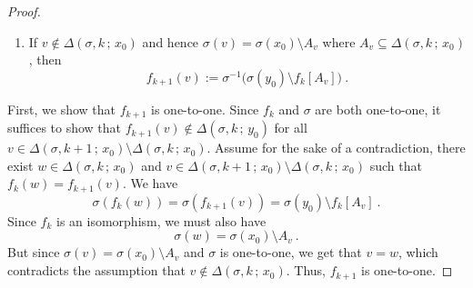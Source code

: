 \documentclass[10pt,a4paper]{amsart}
\begin{document}
\begin{proof}
\begin{enumerate}
\item   If  $  v  \not\in     \Delta \left(  \sigma , k  \,  ;   \,   x_0   \right)     $  
and   hence  $  \sigma ( v )  =   \sigma  ( x_0  )   \setminus  A_v    $
where   $   A_v     \subseteq    \Delta \left(  \sigma , k  \,  ;   \,   x_0   \right)   $, 
then 
\[
 f_{ k+1}  \left( v  \right)     
 := 
 \sigma^{  -1}  \Big(      \sigma  ( y_0 )   \setminus  f_k \left[  A_v  \right]      \Big)  
\      .
\]
\end{enumerate}
First, we show that  $ f_{ k+1}  $  is one-to-one. 
Since  $  f_k$  and $  \sigma $  are both one-to-one,  
it suffices to show that  $  f_{ k+1}  (v)  \not\in    \Delta \left(  \sigma , k  \,  ;   \,   y_0   \right)   $  
for all $  v  \in   \Delta \left(  \sigma , k+1  \,  ;   \,   x_0   \right)   \setminus   \Delta \left(  \sigma , k  \,  ;   \,   x_0   \right)   $.
Assume for the sake of  a contradiction,  there exist
$  w  \in     \Delta \left(  \sigma , k  \,  ;   \,   x_0   \right)   $  and   
$  v  \in   \Delta \left(  \sigma , k+1  \,  ;   \,   x_0   \right)   \setminus   \Delta \left(  \sigma , k  \,  ;   \,   x_0   \right)   $  
such that    
$
f_k (w)  =    f_{ k+1}  \left( v  \right)   
$.
We have 
\[
\sigma \left(   f_k \left( w  \right)     \right)    = 
\sigma \left(   f_{ k+1}  \left( v  \right)     \right)  =      \sigma  ( y_0 )   \setminus  f_k \left[  A_v  \right]   
\       .
\]
Since  $  f_k $  is an isomorphism, we must also have 
\[
\sigma (w)  =     \sigma  ( x_0 )   \setminus   A_v 
\       .
\]
But since  $  \sigma (v)  =   \sigma  ( x_0  )   \setminus  A_v     $  and  $  \sigma  $  is one-to-one, 
we get  that  $  v  =   w  $,  which contradicts the assumption that  
$  v  \not\in     \Delta \left(  \sigma , k  \,  ;   \,   x_0   \right)   $.
Thus,   $  f_{ k+1}  $  is  one-to-one. 










\end{proof}
\end{document}
